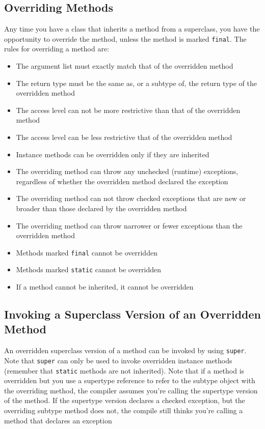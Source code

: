 \subsection{Overriding Methods}
Any time you have a class that inherits a method from a superclass, you have 
the opportunity to override the method, unless the method is marked 
\verb#final#. The rules for overriding a method are:
\begin{itemize}
    \item The argument list must exactly match that of the overridden method
    \item The return type must be the same as, or a subtype of, the return type 
    of the overridden method
    \item The access level can not be more restrictive than that of the 
    overridden method
    \item The access level can be less restrictive that of the overridden 
    method
    \item Instance methods can be overridden only if they are inherited
    \item The overriding method can throw any unchecked (runtime) exceptions, 
    regardless of whether the overridden method declared the exception
    \item The overriding method can not throw checked exceptions that are new 
    or broader than those declared by the overridden method
    \item The overriding method can throw narrower or fewer exceptions than the 
    overridden method
    \item Methods marked \verb#final# cannot be overridden
    \item Methods marked \verb#static# cannot be overridden
    \item If a method cannot be inherited, it cannot be overridden
\end{itemize}

\subsection{Invoking a Superclass Version of an Overridden Method}
An overridden superclass version of a method can be invoked by using 
\verb#super#. Note that \verb#super# can only be used to invoke overridden 
instance methods (remember that \verb#static# methods are not inherited). Note 
that if a method is overridden but you use a supertype reference to refer to 
the subtype object with the overriding method, the compiler assumes you're 
calling the supertype version of the method. If the supertype version declares 
a checked exception, but the overriding subtype method does not, the compile 
still thinks you're calling a method that declares an exception

